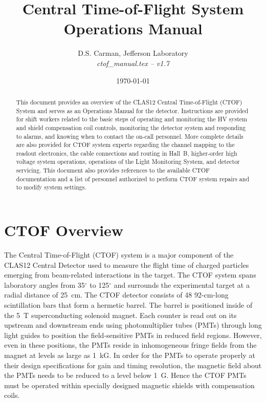 \documentclass[12pt]{article}
\begin{document}
\title{Central Time-of-Flight System Operations Manual}

\vskip 0.5cm

\author{D.S. Carman, Jefferson Laboratory\\[0.2ex]
{\it ctof\_manual.tex -- v1.7}}

\date \today
%
\maketitle

\begin{abstract}
This document provides an overview of the CLAS12 Central Time-of-Flight (CTOF) 
System and serves as an Operations Manual for the detector. Instructions are 
provided for shift workers related to the basic steps of operating and monitoring 
the HV system and shield compensation coil controls, monitoring the detector 
system and responding to alarms, and knowing when to contact the on-call personnel. 
More complete details are also provided for CTOF system experts regarding the 
channel mapping to the readout electronics, the cable connections and routing in 
Hall~B, higher-order high voltage system operations, operations of the Light 
Monitoring System, and detector servicing. This document also provides references 
to the available CTOF documentation and a list of personnel authorized to perform 
CTOF system repairs and to modify system settings.
\end{abstract}

\thispagestyle{empty}

\clearpage

\vfil
\eject

\tableofcontents

\vfil
\eject

\section{CTOF Overview}
\label{intro}

The Central Time-of-Flight (CTOF) system is a major component of the CLAS12 
Central Detector used to measure the flight time of charged particles emerging 
from beam-related interactions in the target. The CTOF system spans laboratory 
angles from 35$^\circ$ to 125$^\circ$ and surrounds the experimental target at a 
radial distance of 25~cm. The CTOF detector consists of 48 92-cm-long scintillation 
bars that form a hermetic barrel. The barrel is positioned inside of the 5~T 
superconducting solenoid magnet. Each counter is read out on its upstream and
downstream ends using photomultiplier tubes (PMTs) through long light guides to 
position the field-sensitive PMTs in reduced field regions. However, even in these 
positions, the PMTs reside in inhomogeneous fringe fields from the magnet at levels 
as large as 1~kG. In order for the PMTs to operate properly at their design 
specifications for gain and timing resolution, the magnetic field about the PMTs 
needs to be reduced to a level below 1~G. Hence the CTOF PMTs must be operated 
within specially designed magnetic shields with compensation coils.
\end{document}
